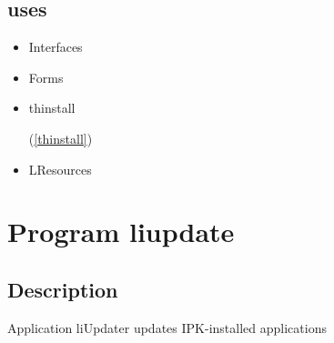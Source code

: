 \documentclass{report}
\begin{document}
\section{uses}
\begin{itemize}
\item \begin{ttfamily}Interfaces\end{ttfamily}\item \begin{ttfamily}Forms\end{ttfamily}\item \begin{ttfamily}thinstall\end{ttfamily}(\ref{thinstall})\item \begin{ttfamily}LResources\end{ttfamily}\end{itemize}
\chapter{Program liupdate}
\label{liupdate}
\section{Description}
Application liUpdater updates IPK{-}installed applications
\end{document}
